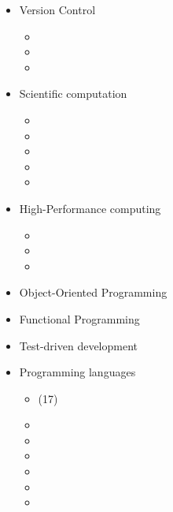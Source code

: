 \documentclass{CurriculumVitae}[10pt, draft, condensed]
\begin{document}
\begin{multicols}{4}
  
  \begin{itemize}[topsep=0pt]
    \setlength{\itemsep}{-0.3em}
  \item {\footnotesize Version Control}
    \begin{itemize}[topsep=0pt, partopsep=0pt]
      \setlength{\itemsep}{-0.3em}
    \item {}
    \item {}
    \item {}
    \end{itemize}
  \item {\footnotesize Scientific computation}
    \begin{itemize}[topsep=0pt, partopsep=0pt]
      \setlength{\itemsep}{-0.3em}
    \item {}
    \item {}
    \item {}
    \item {}
    \item {}
    \end{itemize}
  \item {\footnotesize High-Performance computing}
    \begin{itemize}[topsep=0pt, partopsep=0pt]
      \setlength{\itemsep}{-0.3em}
    \item {}
    \item {}
    \item {}
    \end{itemize}
  \item {\footnotesize Object-Oriented Programming}
  \item {\footnotesize Functional Programming}
  \item {\footnotesize Test-driven development}
  \item {\footnotesize Programming languages}
    \begin{itemize}[topsep=0pt, partopsep=0pt]
      \setlength{\itemsep}{-0.3em}
    \item {} (17)
    \item {}
    \item {}
    \item {}
    \item {}
    \item {}
    \item {}

\end{itemize}
\end{itemize}
\end{multicols}
\end{document}
